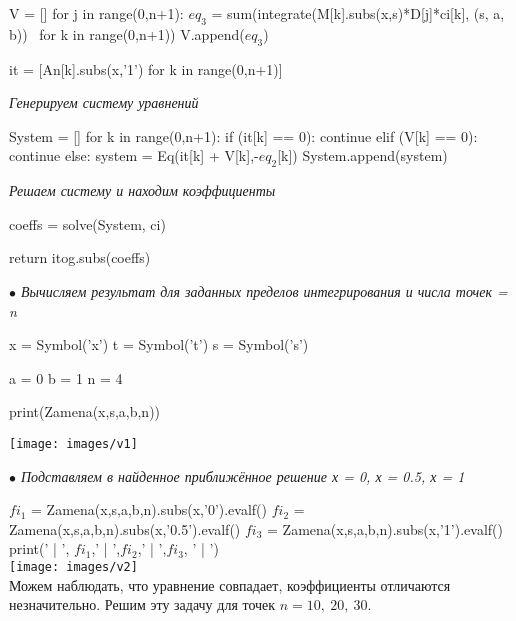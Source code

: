 \documentclass[12pt]{article}
\begin{document}
V = [] \vskip 0.3cm
for j in range(0,n+1): \vskip 0.3cm
$ eq_3 $ = sum(integrate(M[k].subs(x,s)*D[j]*ci[k], (s, a, b)) \ for k in range(0,n+1)) \vskip 0.3cm
V.append($ eq_3 $) \vskip 0.3cm

it = [An[k].subs(x,'1') for k in range(0,n+1)] \vskip 0.3cm

\textit{ Генерируем систему уравнений} \vskip 0.3cm

System = [] \vskip 0.3cm
for k in range(0,n+1): \vskip 0.3cm
if (it[k] == 0):  \vskip 0.3cm
continue \vskip 0.3cm
elif (V[k] == 0): \vskip 0.3cm
continue \vskip 0.3cm
else: \vskip 0.3cm
system = Eq(it[k] + V[k],-$ eq_2 $[k]) \vskip 0.3cm
System.append(system) \vskip 0.3cm

\textit{Решаем систему и находим коэффициенты} \vskip 0.3cm

coeffs = solve(System, ci) \vskip 0.3cm

return itog.subs(coeffs) \vskip 0.3cm

\textit{$ \bullet $                     Вычисляем результат для заданных пределов интегрирования и числа точек = n} \vskip 0.3cm

x = Symbol('x') \vskip 0.3cm
t = Symbol('t') \vskip 0.3cm
s = Symbol('s') \vskip 0.3cm

a = 0 \vskip 0.3cm
b = 1 \vskip 0.3cm
n = 4 \vskip 0.3cm

print(Zamena(x,s,a,b,n)) \vskip 0.3cm

\texttt{[image: images/v1]}           

\textit{$ \bullet $                     Подставляем в найденное приближённое решение х = 0, х = 0.5, х = 1} \vskip 0.3cm

$ fi_1 $ = Zamena(x,s,a,b,n).subs(x,'0').evalf() \vskip 0.3cm
$ fi_2 $ = Zamena(x,s,a,b,n).subs(x,'0.5').evalf() \vskip 0.3cm
$ fi_3 $ = Zamena(x,s,a,b,n).subs(x,'1').evalf() \vskip 0.3cm
print(' | ', $ fi_1 $,' | ',$ fi_2 $,' | ',$ fi_3 $, ' | ') \\

\texttt{[image: images/v2]}  \\

Можем наблюдать, что уравнение совпадает, коэффициенты отличаются незначительно. Решим эту задачу для точек $ n = 10, \: 20, \: 30 $.\\
\end{document}
